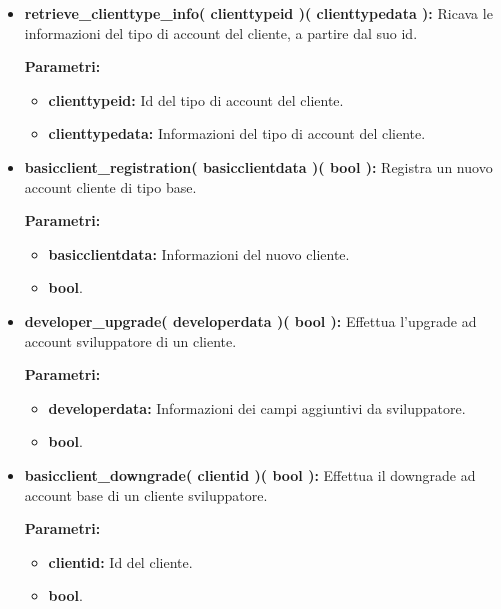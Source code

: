 \begin{itemize}
\begin{itemize}
			\item \textbf{retrieve\_clienttype\_info( clienttypeid )( clienttypedata ):} Ricava le informazioni del tipo di account del cliente, a partire dal suo id.
				\begin{description}
    				\item[\textbf{Parametri:}]
				\end{description}
				\begin{itemize}
					\item \textbf{clienttypeid:} Id del tipo di account del cliente.
					\item \textbf{clienttypedata:} Informazioni del tipo di account del cliente.
				\end{itemize}
				
			\item \textbf{basicclient\_registration( basicclientdata )( bool ):} Registra un nuovo account cliente di tipo base.
				\begin{description}
    				\item[\textbf{Parametri:}]
				\end{description}
				\begin{itemize}
					\item \textbf{basicclientdata:} Informazioni del nuovo cliente.
					\item \textbf{bool}.
				\end{itemize}
				
			\item \textbf{developer\_upgrade( developerdata )( bool ):} Effettua l'upgrade ad account sviluppatore di un cliente.
				\begin{description}
    				\item[\textbf{Parametri:}]
				\end{description}
				\begin{itemize}
					\item \textbf{developerdata:} Informazioni dei campi aggiuntivi da sviluppatore.
					\item \textbf{bool}.
				\end{itemize}
				
			\item \textbf{basicclient\_downgrade( clientid )( bool ):} Effettua il downgrade ad account base di un cliente sviluppatore.
				\begin{description}
    				\item[\textbf{Parametri:}]
				\end{description}
				\begin{itemize}
					\item \textbf{clientid:} Id del cliente.
					\item \textbf{bool}.
				\end{itemize}
				

\end{itemize}
\end{itemize}
